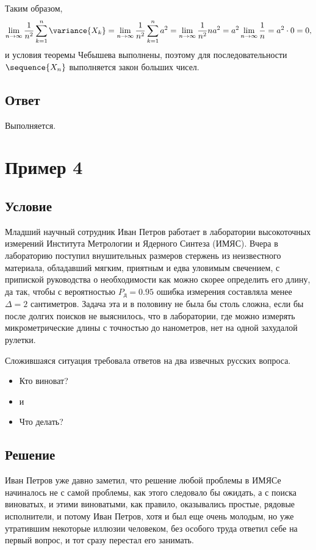 Таким образом,
\begin{equation}
    \lim_{n \rightarrow \infty} \frac{1}{n^2} \sum_{k=1}^n \variance{X_k}
    = \lim_{n \rightarrow \infty} \frac{1}{n^2} \sum_{k=1}^n a^2
    = \lim_{n \rightarrow \infty} \frac{1}{n^2} n a^2
    = a^2 \lim_{n \rightarrow \infty} \frac{1}{n} = a^2 \cdot 0 = 0,
\end{equation}
и условия теоремы Чебышева выполнены, поэтому для последовательности $\sequence{X_n}$ выполняется закон больших чисел.

\subsection*{Ответ}
Выполняется.


\section{Пример 4}
\subsection*{Условие}
Младший научный сотрудник Иван Петров работает в лаборатории высокоточных измерений Института Метрологии и Ядерного Синтеза (ИМЯС).
Вчера в лабораторию поступил внушительных размеров стержень из неизвестного материала, обладавший мягким, приятным и едва уловимым свечением,
с припиской руководства о необходимости как можно скорее определить его длину, да так, чтобы с вероятностью $P_\text{д} = 0.95$ ошибка измерения составляла менее
$\Delta = 2$ сантиметров. Задача эта и в половину не была бы столь сложна, если бы после долгих поисков не выяснилось, что в лаборатории, где можно измерять
микрометрические длины с точностью до нанометров, нет на одной захудалой рулетки.

Сложившаяся ситуация требовала ответов на два извечных русских вопроса.
\begin{itemize}
    \item Кто виноват?
    \item [] и
    \item Что делать?
\end{itemize}

\subsection*{Решение}
Иван Петров уже давно заметил, что решение любой проблемы в ИМЯСе начиналось не с самой проблемы, как этого следовало бы ожидать, а с поиска виноватых, и этими
виноватыми, как правило, оказывались простые, рядовые исполнители, и потому Иван Петров, хотя и был еще очень молодым, но уже утратившим некоторые иллюзии человеком,
без особого труда ответил себе на первый вопрос, и тот сразу перестал его занимать.

